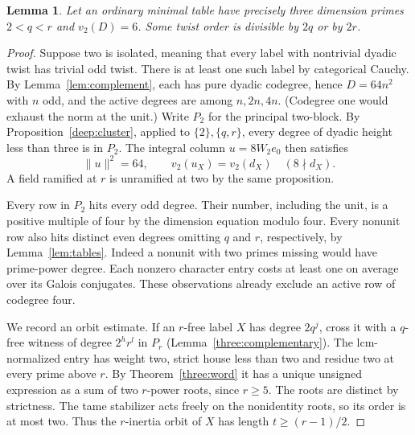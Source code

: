 \documentclass[11pt,a4paper]{article}
\numberwithin{equation}{section}
\newtheorem{lemma}[theorem]{Lemma}
\theoremstyle{remark}
\begin{document}
\begin{lemma}\label{aux:mixed-two}
Let an ordinary minimal table have precisely three dimension primes
$2<q<r$ and $v_2(D)=6$. Some twist order is divisible by $2q$ or
by $2r$.
\end{lemma}
\begin{proof}
Suppose two is isolated, meaning that every label with nontrivial
dyadic twist has trivial odd twist. There is at least one such label
by categorical Cauchy. By Lemma~\ref{lem:complement}, each has
pure dyadic codegree, hence $D=64n^2$ with $n$ odd, and the active
degrees are among $n,2n,4n$. (Codegree one would exhaust the norm
at the unit.) Write $P_2$ for the principal two-block. By
Proposition~\ref{deep:cluster}, applied to $\{2\},\{q,r\}$, every
degree of dyadic height less than three is in $P_2$. The integral
column $u=8W_2e_0$ then satisfies
\[
 \|u\|^2=64,\qquad v_2(u_X)=v_2(d_X)\quad(8\nmid d_X).
\]
A field ramified at $r$ is unramified at two by the same proposition.

Every row in $P_2$ hits every odd degree. Their number, including
the unit, is a positive multiple of four by the dimension equation
modulo four. Every nonunit row also hits distinct even degrees
omitting $q$ and $r$, respectively, by Lemma~\ref{lem:tables}.
Indeed a nonunit with two primes missing would have prime-power
degree. Each nonzero character entry costs at least one on average
over its Galois conjugates. These observations already exclude an
active row of codegree four.

We record an orbit estimate. If an $r$-free label $X$ has degree
$2q^j$, cross it with a $q$-free witness of degree $2^h r^l$ in
$P_r$ (Lemma~\ref{three:complementary}). The lcm-normalized
entry has weight two, strict house less than two and residue two at
every prime above $r$. By Theorem~\ref{three:word} it has a unique
unsigned expression as a sum of two $r$-power roots, since $r\ge5$.
The roots are distinct by strictness. The tame stabilizer acts freely
on the nonidentity roots, so its order is at most two. Thus the
$r$-inertia orbit of $X$ has length $t\ge(r-1)/2$.


\end{proof}
\end{document}
